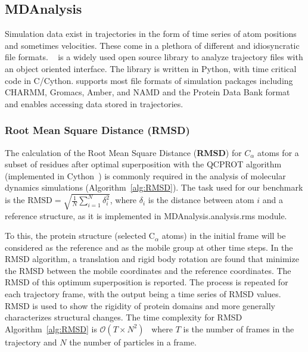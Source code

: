\label{use_cases}

\subsection{MDAnalysis}
\label{sec:mda}

Simulation data exist in trajectories in the form of time series of atom positions and sometimes velocities. These come in a plethora of different and idiosyncratic file formats. 
~\citep{Gowers:2016aa,Michaud-Agrawal:2011fu} is a widely used open source library to analyze trajectory files with an object oriented interface. 
The library is written in Python, with time critical code in C/Cython. 
 supports most file formats of simulation packages including CHARMM, Gromacs, Amber, and NAMD and the Protein Data Bank format and enables accessing data stored in trajectories. 
 
\subsubsection{Root Mean Square Distance (RMSD)}
The calculation of the Root Mean Square Distance (\textbf{RMSD}) for $C_{\alpha}$ atoms for a subset of residues after optimal superposition with the QCPROT algorithm~\cite{Liu:2010kx,Theobald:2005vn} (implemented in Cython~\cite{Gowers:2016aa}) is commonly required in the analysis of molecular dynamics simulations (Algorithm~\ref{alg:RMSD}). 
The task used for our benchmark is the $\text{RMSD}=\sqrt{\frac{1}{N}\sum_{i=1}^{N}\delta_{i}^{2}}$, where $\delta_{i}$ is the distance between atom $i$ and a reference structure, as it is implemented in MDAnalysis.analysis.rms module.  

To this, the protein structure (selected C$_{\alpha}$ atoms) in the initial frame will be considered as the reference and as the mobile group at other time steps. 
In the RMSD algorithm, a translation and rigid body rotation are found that minimize the RMSD between the mobile coordinates and the reference coordinates. 
The RMSD of this optimum superposition is reported. 
The process is repeated for each trajectory frame, with the output being a time series of RMSD values.
RMSD is used to show the rigidity of protein domains and more generally characterizes structural changes.
The time complexity for RMSD Algorithm~\ref{alg:RMSD} is $\mathcal{O}(T \times N^{2})$~\cite{Liu:2010kx} where $T$ is the number of frames in the trajectory and $N$ the number of particles in a frame.

